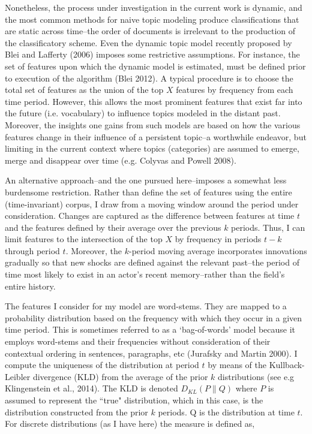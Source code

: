 Nonetheless, the process under investigation in the current work is dynamic, and the most common methods for naive topic modeling produce classifications that are static across time--the order of documents is irrelevant to the production of the classificatory scheme. Even the dynamic topic model recently proposed by Blei and Lafferty (2006) imposes some restrictive assumptions. For instance, the set of features upon which the dynamic model is estimated, must be defined prior to execution of the algorithm (Blei 2012). A typical procedure is to choose the total set of features as the union of the top $X$ features by frequency from each time period. However, this allows the most prominent features that exist far into the future (i.e. vocabulary) to influence topics modeled in the distant past. Moreover, the insights one gains from such models are based on how the various features change in their influence of a persistent topic--a worthwhile endeavor, but limiting in the current context where topics (categories) are assumed to emerge, merge and disappear over time (e.g. Colyvas and Powell 2008).

An alternative approach--and the one pursued here--imposes a somewhat less burdensome restriction. Rather than define the set of features using the entire (time-invariant) corpus, I draw from a moving window around the period under consideration. Changes are captured as the difference between features at time $t$ and the features defined by their average over the previous $k$ periods. Thus, I can limit features to the intersection of the top $X$ by frequency in periods $t-k$ through period $t$. Moreover, the $k$-period moving average incorporates innovations gradually so that new shocks are defined against the relevant past--the period of time most likely to exist in an actor's recent memory--rather than the field's entire history. 

The features I consider for my model are word-stems. They are mapped to a probability distribution based on the frequency with which they occur in a given time period. This is sometimes referred to as a `bag-of-words' model because it employs word-stems and their frequencies without consideration of their contextual ordering in sentences, paragraphs, etc (Jurafsky and Martin 2000). I compute the uniqueness of the distribution at period $t$ by means of the Kullback-Leibler divergence (KLD) from the average of the prior $k$ distributions (see e.g Klingenstein et al., 2014). The KLD is denoted $D_{KL}(P\|Q)$ where $P$ is assumed to represent the ``true" distribution, which in this case, is the distribution constructed from the prior $k$ periods. Q is the distribution at time $t$. For discrete distributions (as I have here) the measure is defined as,

